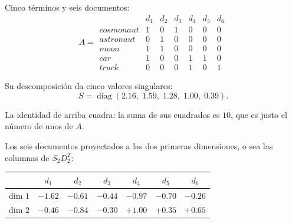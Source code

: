 \documentclass[11pt,letterpaper]{article}
\begin{document}
\begin{ejemplo}
    Cinco términos y seis documentos:
    \[
        A = \begin{array}{l|cccccc}
              & d_1 & d_2 & d_3 & d_4 & d_5 & d_6 \\
            \hline
            \textit{cosmonaut} & 1 & 0 & 1 & 0 & 0 & 0 \\
            \textit{astronaut} & 0 & 1 & 0 & 0 & 0 & 0 \\
            \textit{moon}      & 1 & 1 & 0 & 0 & 0 & 0 \\
            \textit{car}       & 1 & 0 & 0 & 1 & 1 & 0 \\
            \textit{truck}     & 0 & 0 & 0 & 1 & 0 & 1
            \end{array}
    \]

    Su descomposición da cinco valores singulares:
    \[
        S = \operatorname{diag}(2.16,\; 1.59,\; 1.28,\; 1.00,\; 0.39).
    \]

    La identidad de arriba cuadra: la suma de sus cuadrados es $10$,
    que es justo el número de unos de $A$.

    Los seis documentos proyectados a las dos primeras dimensiones,
    o sea las columnas de $S_2 D_2^{T}$:

    \begin{center}
    \begin{tabular}{lcccccc}
        \toprule
        & $d_1$ & $d_2$ & $d_3$ & $d_4$ & $d_5$ & $d_6$ \\
        \midrule
        dim $1$ & $-1.62$ & $-0.61$ & $-0.44$ & $-0.97$ & $-0.70$ &
                  $-0.26$ \\
        dim $2$ & $-0.46$ & $-0.84$ & $-0.30$ & $+1.00$ & $+0.35$ &
                  $+0.65$ \\
        \bottomrule
    \end{tabular}
    \end{center}


\end{ejemplo}
\end{document}
